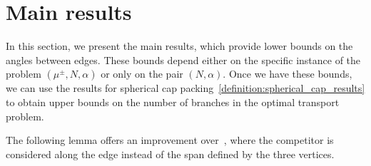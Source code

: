 \documentclass[11pt,reqno,a4paper]{amsart}
\numberwithin{equation}{section}
\theoremstyle{mytheorem}
\theoremstyle{myremark}
\theoremstyle{myparagraph}
\begin{document}
    \section{Main results}

    In this section, we present the main results, which provide lower bounds on the angles between edges.
    These bounds depend either on the specific instance of the problem $(\mu^{\pm}, N, \alpha)$ or only on the pair $(N, \alpha)$.
    Once we have these bounds, we can use the results for spherical cap packing~\ref{definition:spherical_cap_results}
    to obtain upper bounds on the number of branches in the optimal transport problem.

    The following lemma offers an improvement over~\cite[Lemma 12.16]{Bernot},
    where the competitor is considered along the edge instead of the span defined by the three vertices.
\end{document}
